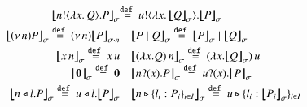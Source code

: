 %
\begin{figure}[t]
\[
\small
\begin{array}{rl}
	\auxmapp{\bout{n}{\abs{x}{Q}} P}{{}}{\sigma} &\!\!\!\!\!\!\defeq
		\bout{u}{\abs{x}{\auxmapp{Q}{{}}{\sigma}}} \auxmapp{P}{{}}{\sigma}
\\[1mm]
\auxmapp{\news{n} P}{{}}{\sigma}  \defeq  \news{n} \auxmapp{P}{{}}{{\sigma \cat n}}
 & 
	\auxmapp{P \Par Q}{{}}{\sigma}  \defeq  \auxmapp{P}{{}}{\sigma} \Par \auxmapp{Q}{{}}{\sigma} 
	\vspace{1mm} \\
	\auxmapp{\appl{x}{n}}{{}}{\sigma}  \defeq
		\appl{x}{u} &
	\auxmapp{\appl{(\lambda x.Q)}{n}}{{}}{\sigma}  \defeq
		\appl{(\lambda x.\auxmapp{Q}{{}}{\sigma})}{u} \\
	\auxmapp{\inact}{{}}{\sigma}  \defeq  \inact
 & 
			\auxmapp{\binp{n}{x} P}{{}}{\sigma}\defeq
		\binp{u}{x} \auxmapp{P}{{}}{\sigma} 
\\[1mm]
	\auxmapp{\bsel{n}{l} P}{{}}{\sigma} \defeq
		\bsel{u}{l} \auxmapp{P}{{}}{\sigma} 
 & 
	\auxmapp{\bbra{n}{l_i:P_i}_{i \in I}}{{}}{\sigma}  \defeq 
		\bbra{u}{l_i:\auxmapp{P_i}{{}}{\sigma}}_{i \in I}
\end{array}
\]

\end{figure}

